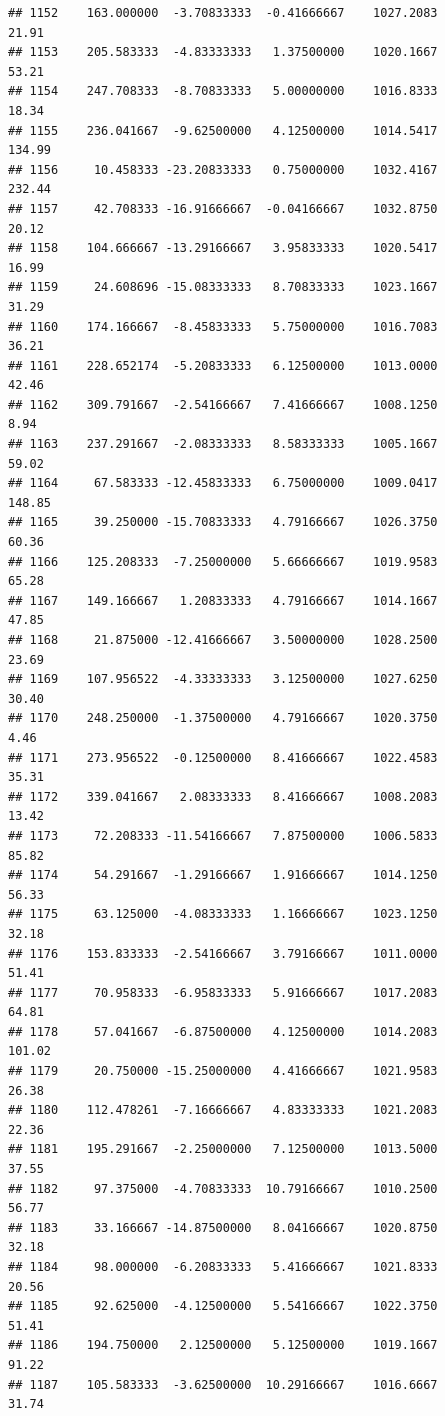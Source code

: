 \documentclass[
]{article}
\begin{document}
\begin{verbatim}
## 1152    163.000000  -3.70833333  -0.41666667    1027.2083       21.91
## 1153    205.583333  -4.83333333   1.37500000    1020.1667       53.21
## 1154    247.708333  -8.70833333   5.00000000    1016.8333       18.34
## 1155    236.041667  -9.62500000   4.12500000    1014.5417      134.99
## 1156     10.458333 -23.20833333   0.75000000    1032.4167      232.44
## 1157     42.708333 -16.91666667  -0.04166667    1032.8750       20.12
## 1158    104.666667 -13.29166667   3.95833333    1020.5417       16.99
## 1159     24.608696 -15.08333333   8.70833333    1023.1667       31.29
## 1160    174.166667  -8.45833333   5.75000000    1016.7083       36.21
## 1161    228.652174  -5.20833333   6.12500000    1013.0000       42.46
## 1162    309.791667  -2.54166667   7.41666667    1008.1250        8.94
## 1163    237.291667  -2.08333333   8.58333333    1005.1667       59.02
## 1164     67.583333 -12.45833333   6.75000000    1009.0417      148.85
## 1165     39.250000 -15.70833333   4.79166667    1026.3750       60.36
## 1166    125.208333  -7.25000000   5.66666667    1019.9583       65.28
## 1167    149.166667   1.20833333   4.79166667    1014.1667       47.85
## 1168     21.875000 -12.41666667   3.50000000    1028.2500       23.69
## 1169    107.956522  -4.33333333   3.12500000    1027.6250       30.40
## 1170    248.250000  -1.37500000   4.79166667    1020.3750        4.46
## 1171    273.956522  -0.12500000   8.41666667    1022.4583       35.31
## 1172    339.041667   2.08333333   8.41666667    1008.2083       13.42
## 1173     72.208333 -11.54166667   7.87500000    1006.5833       85.82
## 1174     54.291667  -1.29166667   1.91666667    1014.1250       56.33
## 1175     63.125000  -4.08333333   1.16666667    1023.1250       32.18
## 1176    153.833333  -2.54166667   3.79166667    1011.0000       51.41
## 1177     70.958333  -6.95833333   5.91666667    1017.2083       64.81
## 1178     57.041667  -6.87500000   4.12500000    1014.2083      101.02
## 1179     20.750000 -15.25000000   4.41666667    1021.9583       26.38
## 1180    112.478261  -7.16666667   4.83333333    1021.2083       22.36
## 1181    195.291667  -2.25000000   7.12500000    1013.5000       37.55
## 1182     97.375000  -4.70833333  10.79166667    1010.2500       56.77
## 1183     33.166667 -14.87500000   8.04166667    1020.8750       32.18
## 1184     98.000000  -6.20833333   5.41666667    1021.8333       20.56
## 1185     92.625000  -4.12500000   5.54166667    1022.3750       51.41
## 1186    194.750000   2.12500000   5.12500000    1019.1667       91.22
## 1187    105.583333  -3.62500000  10.29166667    1016.6667       31.74

\end{verbatim}
\end{document}
